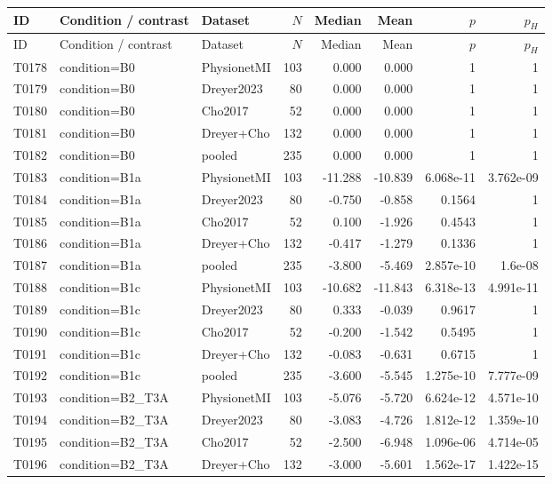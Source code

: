 \begin{longtable}{p{.45in}p{2.6in}p{.75in}rrrrr}
\toprule
ID & Condition / contrast & Dataset & $N$ & Median & Mean & $p$ & $p_H$ \\
\midrule
\endfirsthead
\toprule
ID & Condition / contrast & Dataset & $N$ & Median & Mean & $p$ & $p_H$ \\
\midrule
\endhead
T0178 & condition=B0 & PhysionetMI & 103 & 0.000 & 0.000 & 1 & 1 \\
T0179 & condition=B0 & Dreyer2023 & 80 & 0.000 & 0.000 & 1 & 1 \\
T0180 & condition=B0 & Cho2017 & 52 & 0.000 & 0.000 & 1 & 1 \\
T0181 & condition=B0 & Dreyer+Cho & 132 & 0.000 & 0.000 & 1 & 1 \\
T0182 & condition=B0 & pooled & 235 & 0.000 & 0.000 & 1 & 1 \\
T0183 & condition=B1a & PhysionetMI & 103 & -11.288 & -10.839 & 6.068e-11 & 3.762e-09 \\
T0184 & condition=B1a & Dreyer2023 & 80 & -0.750 & -0.858 & 0.1564 & 1 \\
T0185 & condition=B1a & Cho2017 & 52 & 0.100 & -1.926 & 0.4543 & 1 \\
T0186 & condition=B1a & Dreyer+Cho & 132 & -0.417 & -1.279 & 0.1336 & 1 \\
T0187 & condition=B1a & pooled & 235 & -3.800 & -5.469 & 2.857e-10 & 1.6e-08 \\
T0188 & condition=B1c & PhysionetMI & 103 & -10.682 & -11.843 & 6.318e-13 & 4.991e-11 \\
T0189 & condition=B1c & Dreyer2023 & 80 & 0.333 & -0.039 & 0.9617 & 1 \\
T0190 & condition=B1c & Cho2017 & 52 & -0.200 & -1.542 & 0.5495 & 1 \\
T0191 & condition=B1c & Dreyer+Cho & 132 & -0.083 & -0.631 & 0.6715 & 1 \\
T0192 & condition=B1c & pooled & 235 & -3.600 & -5.545 & 1.275e-10 & 7.777e-09 \\
T0193 & condition=B2\_\allowbreak{}T3A & PhysionetMI & 103 & -5.076 & -5.720 & 6.624e-12 & 4.571e-10 \\
T0194 & condition=B2\_\allowbreak{}T3A & Dreyer2023 & 80 & -3.083 & -4.726 & 1.812e-12 & 1.359e-10 \\
T0195 & condition=B2\_\allowbreak{}T3A & Cho2017 & 52 & -2.500 & -6.948 & 1.096e-06 & 4.714e-05 \\
T0196 & condition=B2\_\allowbreak{}T3A & Dreyer+Cho & 132 & -3.000 & -5.601 & 1.562e-17 & 1.422e-15 \\

\end{longtable}
